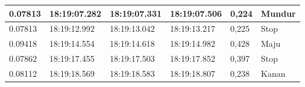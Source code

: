 \begin{longtable}{|l|l|l|l|l|l|}
  0.07813                                                                                                 & 18:19:07.282                                                                                           & 18:19:07.331                                                                                               & 18:19:07.506                                                                                            & 0,224                                              & Mundur                                            \\ \hline
  0.07813                                                                                                 & 18:19:12.992                                                                                           & 18:19:13.042                                                                                               & 18:19:13.217                                                                                            & 0,225                                              & Stop                                              \\ \hline
  0.09418                                                                                                 & 18:19:14.554                                                                                           & 18:19:14.618                                                                                               & 18:19:14.982                                                                                            & 0,428                                              & Maju                                              \\ \hline
  0.07862                                                                                                 & 18:19:17.455                                                                                           & 18:19:17.503                                                                                               & 18:19:17.852                                                                                            & 0,397                                              & Stop                                              \\ \hline
  0.08112                                                                                                 & 18:19:18.569                                                                                           & 18:19:18.583                                                                                               & 18:19:18.807                                                                                            & 0,238                                              & Kanan                                             \\ \hline

\end{longtable}
